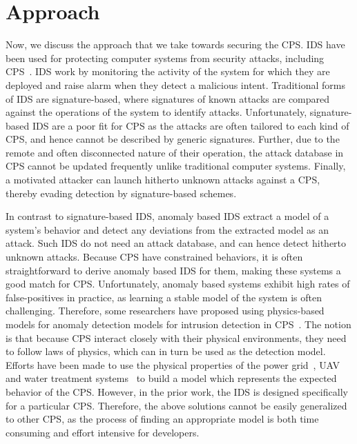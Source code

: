 \section{Approach}
\label{sec:Approach}
Now, we discuss the approach that we take towards securing the \ac{CPS}. \ac{IDS} have been used for protecting computer systems from security attacks, including CPS~\cite{lu2015towards, mitchell2015behavior, bernieri2016testbed}. \ac{IDS} work by monitoring the activity of the system for which they are deployed and raise alarm when they detect a malicious intent. Traditional forms of \ac{IDS} are signature-based, where signatures of known attacks are compared against the operations of the system to identify attacks. Unfortunately, signature-based \ac{IDS} are a poor fit for \ac{CPS} as the attacks are often tailored to each kind of \ac{CPS}, and hence cannot be described by generic signatures. Further, due to the remote and often disconnected nature of their operation, the attack database in \ac{CPS} cannot be updated frequently unlike traditional computer systems. Finally, a motivated attacker can launch hitherto unknown attacks against a \ac{CPS}, thereby evading detection by signature-based schemes. 

In contrast to signature-based \ac{IDS}, anomaly based \ac{IDS} extract a model of a system's behavior and detect any deviations from the extracted model as an attack. Such \ac{IDS} do not need an attack database, and can hence detect hitherto unknown attacks. Because \ac{CPS} have constrained behaviors, it is often straightforward to derive anomaly based \ac{IDS} for them, making these systems a good match for \ac{CPS}. Unfortunately, anomaly based systems exhibit high rates of false-positives in practice, as learning a stable model of the system is often challenging. Therefore, some researchers have proposed using physics-based models for anomaly detection models for intrusion detection in \ac{CPS}~\cite{ mitchell2012specification,mitchell2014adaptive,choudhari2013stability,chen2018learning,zohrevand2016hidden}. The notion is that because \ac{CPS} interact closely with their physical environments, they need to follow laws of physics, which can in turn be used as the detection model. 
Efforts have been made to use the physical properties of the power grid~\cite{choudhari2013stability,paul2014unified}, \ac{UAV}~\cite{mitchell2012specification} and water treatment systems~\cite{adepu2016using} to build a model which represents the expected behavior of the \ac{CPS}. However, in the prior work, the \ac{IDS} is designed specifically for a particular \ac{CPS}. Therefore, the above solutions cannot be easily generalized to other \ac{CPS}, as the process of finding an appropriate model is both time consuming and effort intensive for developers. 

